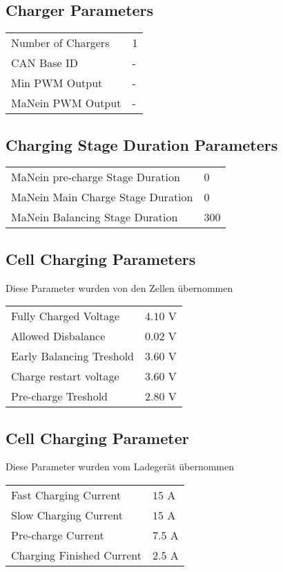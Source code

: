 \subsection*{Charger Parameters}
\begin{tabular}{p{11cm}p{2cm}}
	Number of Chargers & 1 \\
	CAN Base ID & - \\
	Min PWM Output & - \\
	MaNein PWM Output & -
\end{tabular}
\subsection*{Charging Stage Duration Parameters}
\begin{tabular}{p{11cm}p{2cm}}
	MaNein pre-charge Stage Duration & 0 \\
	MaNein Main Charge Stage Duration & 0 \\
	MaNein Balancing Stage Duration & 300
\end{tabular}
\subsection*{Cell Charging Parameters}
Diese Parameter wurden von den Zellen übernommen \cite{lev50}\\
\begin{tabular}{p{11cm}p{2cm}}
	Fully Charged Voltage & $4.10$ V \\
	Allowed Disbalance & $0.02$ V \\
	Early Balancing Treshold & $3.60$ V \\
	Charge restart voltage & $3.60$ V \\
	Pre-charge Treshold & $2.80$ V
\end{tabular}
\subsection*{Cell Charging Parameter}
Diese Parameter wurden vom Ladegerät übernommen \cite{ladegeraet}\\
\begin{tabular}{p{11cm}p{2cm}}
	Fast Charging Current & $15$ A \\
	Slow Charging Current & $15$ A \\
	Pre-charge Current & $7.5$ A \\
	Charging Finished Current & $2.5$ A
\end{tabular}

